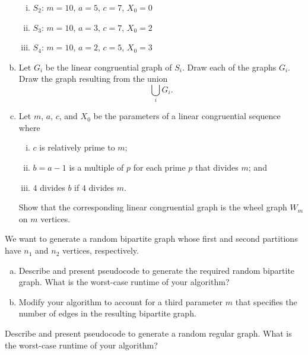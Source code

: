 \begin{problem}
\begin{enumerate}[(a)]
\begin{enumerate}[(i)]
    \item $S_2$: $m = 10$, $a = 5$, $c = 7$, $X_0 = 0$

    \item $S_3$: $m = 10$, $a = 3$, $c = 7$, $X_0 = 2$

    \item $S_4$: $m = 10$, $a = 2$, $c = 5$, $X_0 = 3$
    \end{enumerate}

  \item Let $G_i$ be the linear congruential graph of $S_i$. Draw each
    of the graphs $G_i$. Draw the graph resulting from the union
    \[
    \bigcup_i G_i.
    \]

  \item Let $m$, $a$, $c$, and $X_0$ be the parameters of a linear
    congruential sequence where
    \begin{enumerate}[(i)]
    \item $c$ is relatively prime to $m$;

    \item $b = a - 1$ is a multiple of $p$ for each prime $p$ that
      divides $m$; and

    \item $4$ divides $b$ if $4$ divides $m$.
    \end{enumerate}
    Show that the corresponding linear congruential graph is the wheel
    graph $W_m$ on $m$ vertices.
  \end{enumerate}

\item We want to generate a random bipartite
  graph whose first and second partitions have $n_1$
  and $n_2$ vertices, respectively.
  \begin{enumerate}[(a)]
  \item Describe and present pseudocode to generate the required
    random bipartite
    graph. What is the worst-case runtime of your algorithm?

  \item Modify your algorithm to account for a third parameter $m$
    that specifies the number of edges in the resulting
    bipartite graph.
  \end{enumerate}

\item Describe and present pseudocode to generate a
  random regular
  graph. What is the worst-case runtime of your algorithm?


\end{problem}
